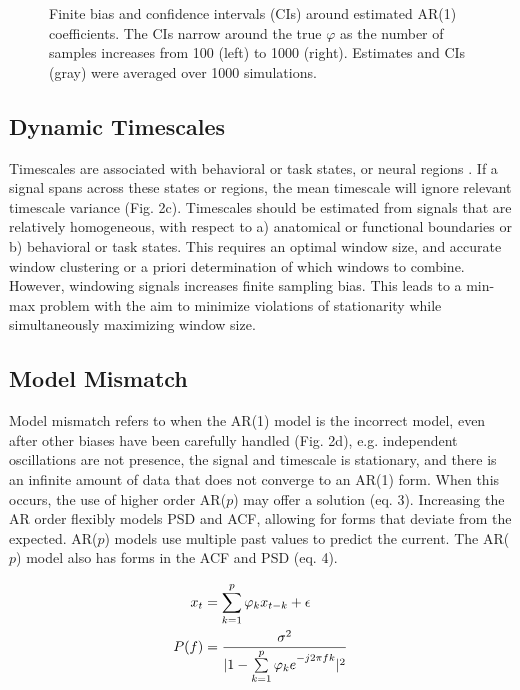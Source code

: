 \documentclass[pdflatex,sn-mathphys-num]{sn-jnl}
\begin{document}

\begin{figure}[htbp]
  \centering
  
  \caption{Finite bias and confidence intervals (CIs) around estimated AR(1) coefficients. The CIs narrow around the true $\varphi$ as the number of samples increases from 100 (left) to 1000 (right). Estimates and CIs (gray) were averaged over 1000 simulations.}
\end{figure}

\subsection{Dynamic Timescales}

Timescales are associated with behavioral or task states, or neural regions \cite{gao_neuronal_2020, spitmaan_multiple_2020}. If a signal spans across these states or regions, the mean timescale will ignore relevant timescale variance (Fig. 2c). Timescales should be estimated from signals that are relatively homogeneous, with respect to a) anatomical or functional boundaries or b) behavioral or task states. This requires an optimal window size, and accurate window clustering or a priori determination of which windows to combine. However, windowing signals increases finite sampling bias. This leads to a min-max problem with the aim to minimize violations of stationarity while simultaneously maximizing window size. 

\subsection{Model Mismatch}

Model mismatch refers to when the AR(1) model is the incorrect model, even after other biases have been carefully handled (Fig. 2d), e.g. independent oscillations are not presence, the signal and timescale is stationary, and there is an infinite amount of data that does not converge to an AR(1) form. When this occurs, the use of higher order AR($p$) may offer a solution (eq. 3). Increasing the AR order flexibly models PSD and ACF, allowing for forms that deviate from the expected. AR($p$) models use multiple past values to predict the current. The AR($p$) model also has forms in the ACF and PSD (eq. 4).

\begin{align}
    x_t &= \sum_{k=1}^p \varphi_k x_{t-k} + \epsilon \label{eq:arp}\\
    P(f) &= \frac{\sigma^{2}}{|1 - \sum\limits_{k=1}^p \varphi_{k} e\strut^{-j 2 \pi f k}|^{2}} \label{eq:arp_psd}
\end{align}
\end{document}
